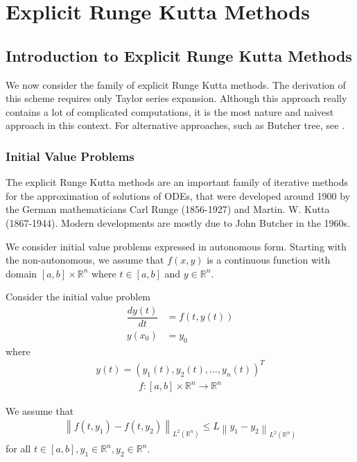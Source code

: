 \documentclass[a4paper,oneside]{book}
\numberwithin{equation}{chapter}
\begin{document}
\part{Explicit Runge Kutta Methods}
\chapter{Introduction to Explicit Runge Kutta Methods}
We now consider the family of explicit Runge Kutta methods. The derivation of this scheme requires only Taylor series expansion. Although this approach really contains a lot of complicated computations, it is the most nature and naivest approach in this context. For alternative approaches, such as Butcher tree, see \cite{butcher}.
\section{Initial Value Problems}
The explicit Runge Kutta methods are an important family of iterative methods for the approximation of solutions of ODEs, that were developed around 1900 by the German mathematicians Carl Runge (1856-1927) and Martin. W. Kutta (1867-1944). Modern developments are mostly due to John Butcher in the 1960s.

We consider initial value problems expressed in autonomous form. Starting with the non-autonomous, we assume that $f\left(x,y\right)$ is a continuous function with domain $\left[a,b\right]\times \mathbb{R}^n$ where $t \in \left[a,b\right]$ and $y\in \mathbb{R}^n$.

Consider the initial value problem
\begin{align}
\label{1}
\dfrac{{dy\left( t \right)}}{{dt}} &= f\left( {t,y\left( t \right)} \right)\\
y\left( x_0 \right) &= {y_0}
\end{align}
where
\begin{align}
y\left( t \right) = {\left( {{y_1}\left( t \right),{y_2}\left( t \right), \ldots ,{y_n}\left( t \right)} \right)^T}
\end{align}
\begin{align}
f:\left[ {a,b} \right] \times {\mathbb{R}^n} \to {\mathbb{R}^n}
\end{align}

We assume that
\begin{align}
{\left\| {f\left( {t,{y_1}} \right) - f\left( {t,{y_2}} \right)} \right\|_{{L^2}\left( {{\mathbb{R}^n}} \right)}} \le L{\left\| {{y_1} - {y_2}} \right\|_{{L^2}\left( {{\mathbb{R}^n}} \right)}}
\end{align}
for all $t \in \left[ {a,b} \right],{y_1} \in {\mathbb{R}^n},{y_2} \in {\mathbb{R}^n}$.
\end{document}
